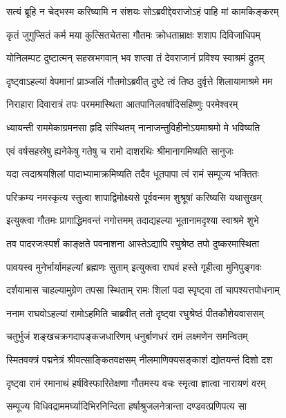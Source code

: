 \twolineshloka
{सत्यं ब्रूहि न चेद्भस्म करिष्यामि न संशयः}
{सोऽब्रवीद्देवराजोऽहं पाहि मां कामकिङ्करम्} %

\twolineshloka
{कृतं जुगुप्सितं कर्म मया कुत्सितचेतसा}
{गौतमः क्रोधताम्राक्षः शशाप दिविजाधिपम्} %

\twolineshloka
{योनिलम्पट दुष्टात्मन् सहस्रभगवान् भव}
{शप्त्वा तं देवराजानं प्रविश्य स्वाश्रमं द्रुतम्} %

\twolineshloka
{दृष्ट्वाऽहल्यां वेपमानां प्राञ्जलिं गौतमोऽब्रवीत्}
{दुष्टे त्वं तिष्ठ दुर्वृत्ते शिलायामाश्रमे मम} %

\twolineshloka
{निराहारा दिवारात्रं तपः परममास्थिता}
{आतपानिलवर्षादिसहिष्णुः परमेश्वरम्} %

\twolineshloka
{ध्यायन्ती राममेकाग्रमनसा हृदि संस्थितम्}
{नानाजन्तुविहीनोऽयमाश्रमो मे भविष्यति} %

\twolineshloka
{एवं वर्षसहस्रेषु ह्यनेकेषु गतेषु च}
{रामो दाशरथिः श्रीमानागमिष्यति सानुजः} %

\twolineshloka
{यदा त्वदाश्रयशिलां पादाभ्यामाक्रमिष्यति}
{तदैव धूतपापा त्वं रामं सम्पूज्य भक्तितः} %

\twolineshloka
{परिक्रम्य नमस्कृत्य स्तुत्वा शापाद्विमोक्ष्यसे}
{पूर्ववन्मम शुश्रूषां करिष्यसि यथासुखम्} %

\twolineshloka
{इत्युक्त्वा गौतमः प्रागाद्धिमवन्तं नगोत्तमम्}
{तदाद्यहल्या भूतानामदृश्या स्वाश्रमे शुभे} %

\twolineshloka
{तव पादरजःस्पर्शं काङ्क्षते पवनाशना}
{आस्तेऽद्यापि रघुश्रेष्ठ तपो दुष्करमास्थिता} %

\twolineshloka
{पावयस्व मुनेर्भार्यामहल्यां ब्रह्मणः सुताम्}
{इत्युक्त्वा राघवं हस्ते गृहीत्वा मुनिपुङ्गवः} %

\twolineshloka
{दर्शयामास चाहल्यामुग्रेण तपसा स्थिताम्}
{रामः शिलां पदा स्पृष्ट्वा तां चापश्यत्तपोधनाम्} %

\twolineshloka
{ननाम राघवोऽहल्यां रामोऽहमिति चाब्रवीत्}
{ततो दृष्ट्वा रघुश्रेष्ठं पीतकौशेयवाससम्} %

\twolineshloka
{चतुर्भुजं शङ्खचक्रगदापङ्कजधारिणम्}
{धनुर्बाणधरं रामं लक्ष्मणेन समन्वितम्} %

\twolineshloka
{स्मितवक्त्रं पद्मनेत्रं श्रीवत्साङ्कितवक्षसम्}
{नीलमाणिक्यसङ्काशं द्योतयन्तं दिशो दश} %

\twolineshloka
{दृष्ट्वा रामं रमानाथं हर्षविस्फारितेक्षणा}
{गौतमस्य वचः स्मृत्वा ज्ञात्वा नारायणं वरम्} %

\twolineshloka
{सम्पूज्य विधिवद्राममर्घ्यादिभिरनिन्दिता}
{हर्षाश्रुजलनेत्रान्ता दण्डवत्प्रणिपत्य सा} %

